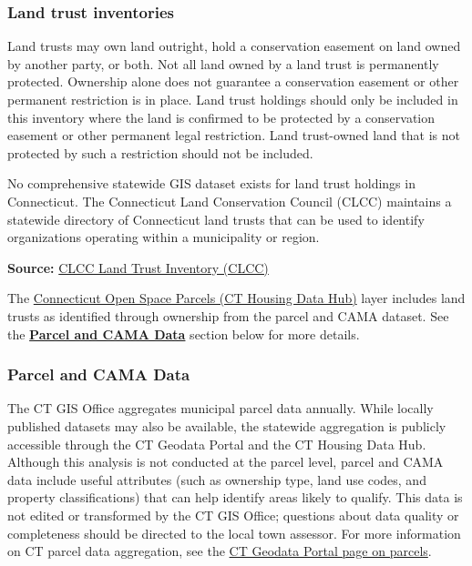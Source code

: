 \documentclass[
  letterpaper,
  DIV=11,
  numbers=noendperiod]{scrreprt}
\begin{document}
\subsubsection{Land trust inventories}\label{sec-land-trust-inventories}

Land trusts may own land outright, hold a conservation easement on land
owned by another party, or both. Not all land owned by a land trust is
permanently protected. Ownership alone does not guarantee a conservation
easement or other permanent restriction is in place. Land trust holdings
should only be included in this inventory where the land is confirmed to
be protected by a conservation easement or other permanent legal
restriction. Land trust-owned land that is not protected by such a
restriction should not be included.

No comprehensive statewide GIS dataset exists for land trust holdings in
Connecticut. The Connecticut Land Conservation Council (CLCC) maintains
a statewide directory of Connecticut land trusts that can be used to
identify organizations operating within a municipality or region.

\textbf{Source:}
\href{https://ctconservation.org/what-is-a-land-trust/\#maps}{CLCC Land
Trust Inventory (CLCC)}

The
\href{https://housingmaps.ct.gov/datasets/ctmaps::connecticut-protected-open-space-parcels/about}{Connecticut
Open Space Parcels (CT Housing Data Hub)} layer includes land trusts as
identified through ownership from the parcel and CAMA dataset. See the
\hyperref[sec-parcel-and-cama-data2]{\textbf{Parcel and CAMA Data}}
section below for more details.

\subsubsection{Parcel and CAMA Data}\label{sec-parcel-and-cama-data2}

The CT GIS Office aggregates municipal parcel data annually. While
locally published datasets may also be available, the statewide
aggregation is publicly accessible through the CT Geodata Portal and the
CT Housing Data Hub. Although this analysis is not conducted at the
parcel level, parcel and CAMA data include useful attributes (such as
ownership type, land use codes, and property classifications) that can
help identify areas likely to qualify. This data is not edited or
transformed by the CT GIS Office; questions about data quality or
completeness should be directed to the local town assessor. For more
information on CT parcel data aggregation, see the
\href{https://geodata.ct.gov/pages/parcels}{CT Geodata Portal page on
parcels}.
\end{document}

